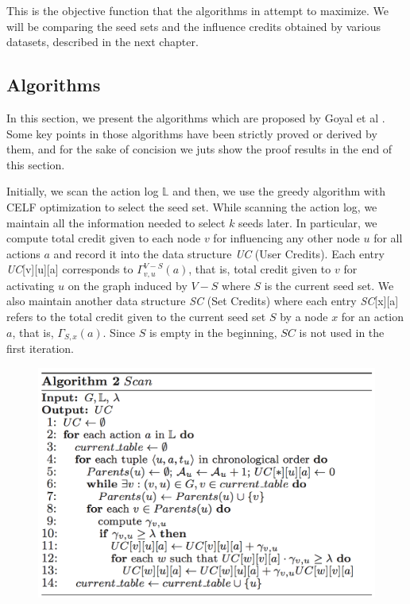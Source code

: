\documentclass{acm_proc_article-sp}
\begin{document}
This is the objective function that the algorithms in \cite{goyal:datainfluence} attempt to maximize. We will be comparing the seed sets and the influence credits obtained by various datasets, described in the next chapter.

\subsection{Algorithms}
In this section, we present the algorithms which are proposed by Goyal et al  \cite{goyal:datainfluence}. Some key points in those algorithms have been strictly proved or derived by them, and for the sake of concision we juts show the proof results in the end of this section.

Initially, we scan the action log $\mathbb{L}$ and then, we use the greedy algorithm with CELF optimization to select the seed set. While scanning the action log, we maintain all the information needed to select $k$ seeds later. In particular, we compute total credit given to each node $v$ for influencing any other node $u$ for all actions $a$ and record it into the data structure \textit{UC} (User Credits). Each entry \textit{UC}[v][u][a] corresponds to $\Gamma_{v,u}^{V-S}(a)$, that is, total credit given to $v$ for activating $u$ on the graph induced by $V − S$ where $S$ is the current seed set. We also maintain another data structure \textit{SC }(Set Credits) where each entry \textit{SC}[x][a] refers to the total credit given to the current seed set $S$ by a node $x$ for an action $a$, that is, $\Gamma_{S,x}(a)$. Since $S$ is empty in the beginning, $SC$ is not used in the first iteration.

\begin{figure}
	\includegraphics[scale=0.4]{al2.png}
	\centering
	\label{al2}
\end{figure}
\end{document}
